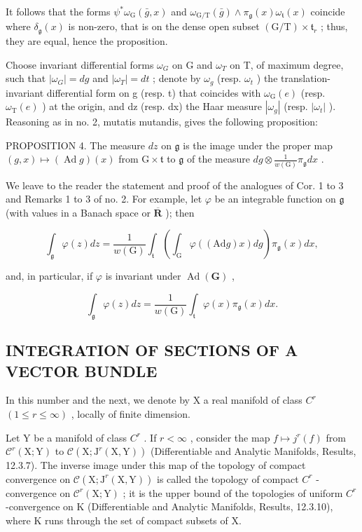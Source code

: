 It follows that the forms \(\psi^{*}\omega_{\mathrm{G}}(\bar{g},x)\) and \(\omega_{\mathrm{G / T}}(\bar{g})\wedge \pi_{\mathfrak{g}}(x)\omega_{\mathfrak{t}}(x)\) coincide where \(\delta_{\mathfrak{g}}(x)\) is non-zero, that is on the dense open subset \((\mathrm{G / T})\times \mathfrak{t}_r\) ; thus, they are equal, hence the proposition.

Choose invariant differential forms \(\omega_{G}\) on G and \(\omega_{T}\) on T, of maximum degree, such that \(|\omega_{G}| = dg\) and \(|\omega_{T}| = dt\) ; denote by \(\omega_{g}\) (resp. \(\omega_{t}\) ) the translation-invariant differential form on g (resp. t) that coincides with \(\omega_{\mathrm{G}}(e)\) (resp. \(\omega_{\mathrm{T}}(e)\) ) at the origin, and dz (resp. dx) the Haar measure \(|\omega_{g}|\) (resp. \(|\omega_{t}|\) ). Reasoning as in no. 2, mutatis mutandis, gives the following proposition:

PROPOSITION 4. The measure \(dz\) on \(\mathfrak{g}\) is the image under the proper map \((g,x)\mapsto (\operatorname {Ad}g)(x)\) from \(\mathrm{G}\times \mathfrak{t}\) to \(\mathfrak{g}\) of the measure \(dg\otimes \frac{1}{w(\mathrm{G})}\pi_{\mathfrak{g}}dx\) .

We leave to the reader the statement and proof of the analogues of Cor. 1 to 3 and Remarks 1 to 3 of no. 2. For example, let \(\varphi\) be an integrable function on \(\mathfrak{g}\) (with values in a Banach space or \(\overline{\mathbf{R}}\) ); then

\[
\int_ {\mathfrak {g}} \varphi (z) d z = \frac {1}{w (\mathrm{G})} \int_ {\mathfrak {t}} \left(\int_ {\mathrm{G}} \varphi ((\mathrm{Ad} g) x) d g\right) \pi_ {\mathfrak {g}} (x) d x,\tag{12}
\]

and, in particular, if \(\varphi\) is invariant under \(\operatorname{Ad}(\mathbf{G})\) ,

\[
\int_ {\mathfrak {g}} \varphi (z) d z = \frac {1}{w (\mathrm{G})} \int_ {\mathfrak {t}} \varphi (x) \pi_ {\mathfrak {g}} (x) d x.\tag{13}
\]

\subsection{INTEGRATION OF SECTIONS OF A VECTOR BUNDLE}

In this number and the next, we denote by X a real manifold of class \(C^{r}\) \((1 \leq r \leq \infty)\) , locally of finite dimension.

Let Y be a manifold of class \(C^{r}\) . If \(r < \infty\) , consider the map \(f \mapsto j^{r}(f)\) from \(\mathcal{C}^{r}(\mathrm{X};\mathrm{Y})\) to \(\mathcal{C}(\mathrm{X};\mathrm{J}^{r}(\mathrm{X},\mathrm{Y}))\) (Differentiable and Analytic Manifolds, Results, 12.3.7). The inverse image under this map of the topology of compact convergence on \(\mathcal{C}(\mathrm{X};\mathrm{J}^{r}(\mathrm{X},\mathrm{Y}))\) is called the topology of compact \(C^{r}\) -convergence on \(\mathcal{C}^{r}(\mathrm{X};\mathrm{Y})\) ; it is the upper bound of the topologies of uniform \(C^{r}\) -convergence on K (Differentiable and Analytic Manifolds, Results, 12.3.10), where K runs through the set of compact subsets of X.

